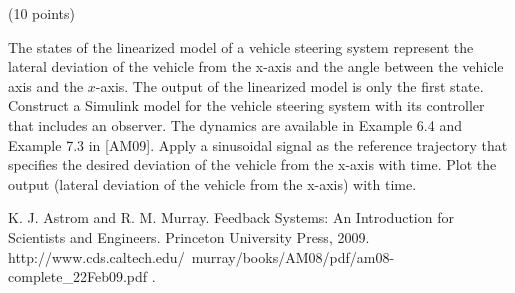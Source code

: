 \documentclass[a4paper,12pt]{article}
\begin{document}
\begin{problem}{}
(10 points) 

\smallskip
\noindent
The states of the linearized model of a vehicle steering system represent the lateral deviation of the vehicle from the x-axis and the angle between the vehicle axis and the $x$-axis. The output of the linearized model is only the first state. Construct a Simulink model for the vehicle steering system with its controller that includes an observer. The dynamics are available in Example 6.4 and Example 7.3 in [AM09]. Apply a sinusoidal signal as the reference trajectory that specifies the desired deviation of the vehicle from the x-axis with time. Plot the output (lateral deviation of the vehicle from the x-axis) with time. 

\smallskip
\noindent
[AM09] K. J. Astrom and R. M. Murray. Feedback Systems: An Introduction for Scientists and Engineers. Princeton University Press, 2009. \\
http://www.cds.caltech.edu/~murray/books/AM08/pdf/am08-complete\_22Feb09.pdf . \\
\\
\begin{minipage}{1\textwidth}
        \rectangle{\linewidth}{19cm}
\end{minipage}
\newpage
\ \\
\begin{minipage}{1\textwidth}
        \rectangle{\linewidth}{24cm}
\end{minipage}
\newpage
\ \\
\begin{minipage}{1\textwidth}
		\rectangle{\linewidth}{24cm}
\end{minipage}
\newpage
\ \\
\begin{minipage}{1\textwidth}
        \rectangle{\linewidth}{24cm}
\end{minipage}
\end{problem}


\newpage
\end{document}
